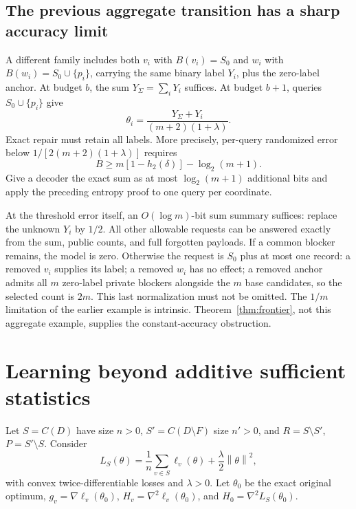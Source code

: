\documentclass[11pt,a4paper]{article}
\theoremstyle{definition}\newtheorem{definition}[theorem]{Definition}
\newcommand{\norm}[1]{\left\lVert #1\right\rVert}
\newcommand{\minus}{\setminus}
\begin{document}
\subsection{The previous aggregate transition has a sharp accuracy limit}
A different family includes both $v_i$ with $B(v_i)=S_0$ and $w_i$ with $B(w_i)=S_0\cup\{p_i\}$, carrying the same binary label $Y_i$, plus the zero-label anchor. At budget $b$, the sum $Y_\Sigma=\sum_iY_i$ suffices. At budget $b+1$, queries $S_0\cup\{p_i\}$ give
\[
 \theta_i=\frac{Y_\Sigma+Y_i}{(m+2)(1+\lambda)}.
\]
Exact repair must retain all labels. More precisely, per-query randomized error below $1/[2(m+2)(1+\lambda)]$ requires
\[
 B\ge m[1-h_2(\delta)]-\log_2(m+1).
\]
Give a decoder the exact sum as at most $\log_2(m+1)$ additional bits and apply the preceding entropy proof to one query per coordinate.

At the threshold error itself, an $O(\log m)$-bit sum summary suffices: replace the unknown $Y_i$ by $1/2$. All other allowable requests can be answered exactly from the sum, public counts, and full forgotten payloads. If a common blocker remains, the model is zero. Otherwise the request is $S_0$ plus at most one record: a removed $v_i$ supplies its label; a removed $w_i$ has no effect; a removed anchor admits all $m$ zero-label private blockers alongside the $m$ base candidates, so the selected count is $2m$. This last normalization must not be omitted. The $1/m$ limitation of the earlier example is intrinsic. Theorem~\ref{thm:frontier}, not this aggregate example, supplies the constant-accuracy obstruction.

\section{Learning beyond additive sufficient statistics}\label{sec:convex}
Let $S=C(D)$ have size $n>0$, $S'=C(D\minus F)$ size $n'>0$, and $R=S\minus S'$, $P=S'\minus S$. Consider
\[
 L_S(\theta)=\frac1n\sum_{v\in S}\ell_v(\theta)+\frac\lambda2\norm\theta^2,
\]
with convex twice-differentiable losses and $\lambda>0$. Let $\theta_0$ be the exact original optimum, $g_v=\nabla\ell_v(\theta_0)$, $H_v=\nabla^2\ell_v(\theta_0)$, and $H_0=\nabla^2L_S(\theta_0)$.
\end{document}
